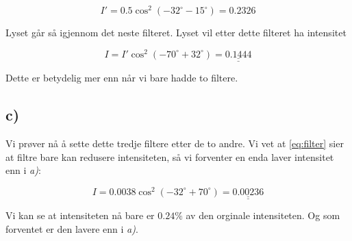 \documentclass[a4paper,norsk, 10pt]{article}
\begin{document}
$$
I' = 0.5\cos^2(-32^{\circ} - 15^{\circ}) = 0.2326
$$ 

Lyset går så igjennom det neste filteret. Lyset vil etter dette filteret ha intensitet

$$
I = I'\cos^2(-70^{\circ} + 32^{\circ}) = \underline{\underline{0.1444}}
$$

Dette er betydelig mer enn når vi bare hadde to filtere.

\subsection*{c)}

Vi prøver nå å sette dette tredje filtere etter de to andre. Vi vet at \eqref{eq:filter} sier at filtre bare kan redusere intensiteten, så vi forventer en enda laver intensitet enn i \textit{a)}:

$$
I = 0.0038\cos^2(-32^{\circ} + 70^{\circ}) = \underline{\underline{0.00236}}
$$

Vi kan se at intensiteten nå bare er $0.24\%$ av den orginale intensiteten. Og som forventet er den lavere enn i \textit{a)}.
\end{document}

